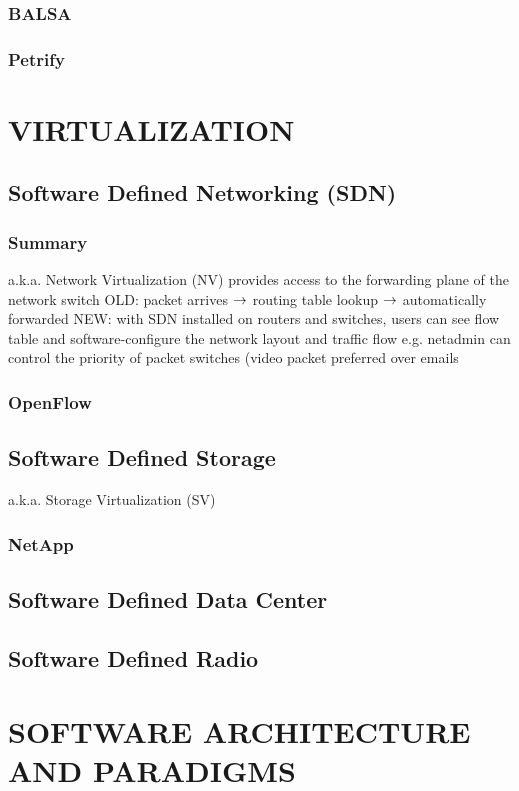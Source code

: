 \documentclass{myproc}
\begin{document}
\subsubsection{BALSA}
\subsubsection{Petrify} 

\section{VIRTUALIZATION}
\subsection{Software Defined Networking (SDN)}
\subsubsection{Summary}
\bit
\w a.k.a. Network Virtualization (NV)
\w provides access to the forwarding plane of the network switch
\w OLD: packet arrives $\mbox{$\rightarrow$}$ routing table lookup $\mbox{$\rightarrow$}$ automatically
forwarded
\w NEW: with SDN installed on routers and switches, users can see flow table
and software-configure the network layout and traffic flow
   \bit
   \w e.g. netadmin can control the priority of packet switches (video packet
   preferred over emails
   \eit
\eit
\subsubsection{\textcolor{red2}{\bf{}OpenFlow}}

\subsection{Software Defined Storage}
\bit
\w a.k.a. Storage Virtualization (SV)
\eit
\subsubsection{NetApp}

\subsection{Software Defined Data Center}
\subsection{Software Defined Radio}

\section{SOFTWARE ARCHITECTURE AND PARADIGMS}
\end{document}
